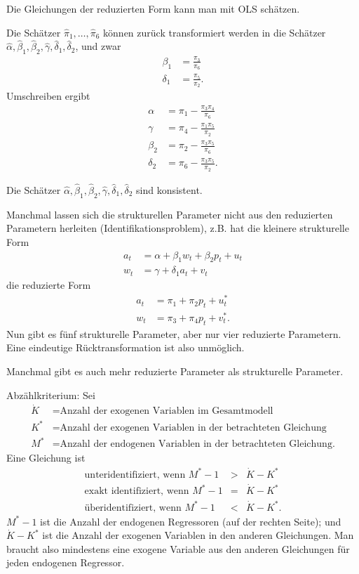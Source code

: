 \documentclass{article}
\begin{document}
Die Gleichungen der reduzierten Form kann man mit OLS schätzen.

Die Schätzer $\hat{\pi}_{1},\ldots ,\hat{\pi}_{6}$ können zurück
transformiert werden in die Schätzer $\hat{\alpha},\hat{\beta}_{1},\hat{\beta}_{2},
\hat{\gamma},\hat{\delta}_{1},\hat{\delta}_{2}$, und zwar
\begin{align*}
\beta _{1} &=\frac{\pi _{3}}{\pi _{6}} \\
\delta _{1} &=\frac{\pi _{5}}{\pi _{2}}.
\end{align*}
Umschreiben ergibt
\begin{align*}
\alpha &=\pi _{1}-\frac{\pi _{3}\pi _{4}}{\pi _{6}} \\
\gamma &=\pi _{4}-\frac{\pi _{1}\pi _{5}}{\pi _{2}} \\
\beta _{2} &=\pi _{2}-\frac{\pi _{3}\pi _{5}}{\pi _{6}} \\
\delta _{2} &=\pi _{6}-\frac{\pi _{3}\pi _{5}}{\pi _{2}}.
\end{align*}

Die Schätzer $\hat{\alpha},\hat{\beta}_{1},\hat{\beta}_{2},
\hat{\gamma},\hat{\delta}_{1},\hat{\delta}_{2}$ sind konsistent.

Manchmal lassen sich die strukturellen Parameter nicht aus den
reduzierten Parametern herleiten (Identifikationsproblem), z.B.
hat die kleinere strukturelle Form
\begin{align*}
a_{t} &=\alpha +\beta _{1}w_{t}+\beta _{2}p_{t}+u_{t} \\
w_{t} &=\gamma +\delta _{1}a_{t}+v_{t}
\end{align*}
die reduzierte Form
\begin{align*}
a_{t} &=\pi _{1}+\pi _{2}p_{t}+u_{t}^{\ast } \\
w_{t} &=\pi _{3}+\pi _{4}p_{t}+v_{t}^{\ast }.
\end{align*}
Nun gibt es fünf strukturelle Parameter, aber nur vier
reduzierte Parametern. Eine eindeutige Rücktransformation
ist also unmöglich.

Manchmal gibt es auch mehr reduzierte Parameter als strukturelle
Parameter. 

Abzählkriterium: Sei
\begin{align*}
\dot{K} &=\text{Anzahl der exogenen Variablen im Gesamtmodell} \\
K^{\ast } &=\text{Anzahl der exogenen Variablen in der betrachteten Gleichung} \\
M^{\ast } &=\text{Anzahl der endogenen Variablen in der betrachteten Gleichung.}
\end{align*}
Eine Gleichung ist
\begin{eqnarray*}
	\text{unteridentifiziert, wenn }M^{\ast }-1 &>&\dot{K}-K^{\ast } \\
	\text{exakt identifiziert, wenn }M^{\ast }-1 &=&\dot{K}-K^{\ast } \\
	\text{überidentifiziert, wenn }M^{\ast }-1 &<&\dot{K}-K^{\ast }.
\end{eqnarray*}
$M^{\ast }-1$ ist die Anzahl der endogenen Regressoren (auf der rechten Seite);
und $\dot{K}-K^{\ast }$ ist die Anzahl der exogenen Variablen in den anderen
Gleichungen. Man braucht also mindestens eine exogene Variable aus den anderen
Gleichungen für jeden endogenen Regressor.
\end{document}
